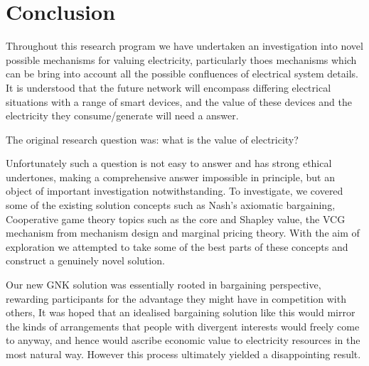 \chapter{Conclusion}
\label{cha:conc}

Throughout this research program we have undertaken an investigation into novel possible mechanisms for valuing electricity, particularly thoes mechanisms which can be bring into account all the possible confluences of electrical system details.
It is understood that the future network will encompass differing electrical situations with a range of smart devices, and the value of these devices and the electricity they consume/generate will need a answer.

The original research question was: what is the value of electricity?

Unfortunately such a question is not easy to answer and has strong ethical undertones, making a comprehensive answer impossible in principle, but an object of important investigation notwithstanding.
To investigate, we covered some of the existing solution concepts such as Nash's axiomatic bargaining, Cooperative game theory topics such as the core and Shapley value, the VCG mechanism from mechanism design and marginal pricing theory.
With the aim of exploration we attempted to take some of the best parts of these concepts and construct a genuinely novel solution.

Our new GNK solution was essentially rooted in bargaining perspective, rewarding participants for the advantage they might have in competition with others, 
It was hoped that an idealised bargaining solution like this would mirror the kinds of arrangements that people with divergent interests would freely come to anyway, and hence would ascribe economic value to electricity resources in the most natural way.
However this process ultimately yielded a disappointing result.



